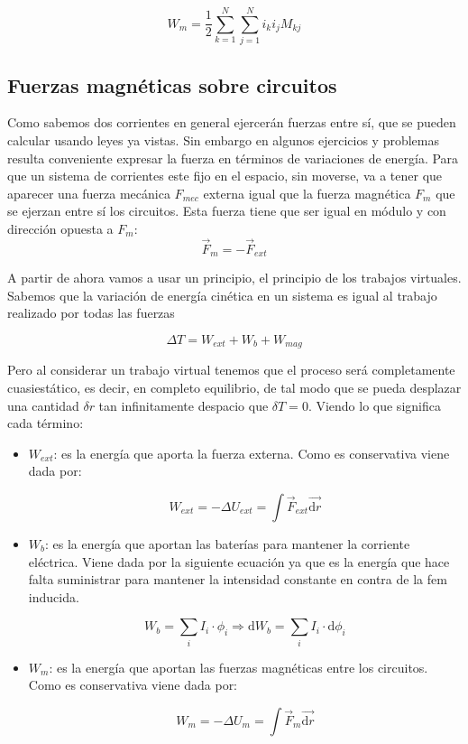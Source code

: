 \documentclass[12pt,a4paper]{article}
\newcommand{\D}{\mathrm{d}}
\begin{document}
\begin{equation}
W_m = \dfrac{1}{2} \sum_{k=1}^N  \sum_{j=1}^N i_k i_j M_{kj}
\end{equation}

\subsection{Fuerzas magnéticas sobre circuitos}

Como sabemos dos corrientes en general ejercerán fuerzas entre sí, que se pueden calcular usando leyes ya vistas. Sin embargo en algunos ejercicios y problemas resulta conveniente expresar la fuerza en términos de variaciones de energía. Para que un sistema de corrientes este fijo en el espacio, sin moverse, va a tener que aparecer una fuerza mecánica $F_{mec}$ externa igual que la fuerza magnética $F_m$ que se ejerzan entre sí los circuitos. Esta fuerza tiene que ser igual en módulo y con dirección opuesta a $F_m$: \\

\begin{equation}
\vec{F}_m = -  \vec{F}_{ext}
\end{equation}

A partir de ahora vamos a usar un principio, el principio de los trabajos virtuales. Sabemos que la variación de energía cinética en un sistema es igual al trabajo realizado por todas las fuerzas 

\begin{equation}
\Delta T = W_{ext} + W_{b} + W_{mag}
\end{equation}

Pero al considerar un trabajo virtual tenemos que el proceso será completamente cuasiestático, es decir, en completo equilibrio, de tal modo que se pueda desplazar una cantidad $\delta r$ tan infinitamente despacio que $\delta T = 0$. Viendo lo que significa cada término:

\begin{itemize}
\item $W_{ext}$: es la energía que aporta la fuerza externa. Como es conservativa viene dada por: 

$$W_{ext} = - \Delta U_{ext} = \int \vec{F}_{ext} \vec{\D r} $$

\item $W_{b}$: es la energía que aportan las baterías para mantener la corriente eléctrica. Viene dada por la siguiente ecuación ya que es la energía que hace falta suministrar para mantener la intensidad constante en contra de la fem inducida.

$$W_{b} = \sum_i I_i  \cdot \phi_i  \Longrightarrow \D W_b = \sum_i I_i \cdot \D \phi_i $$ 

\item $W_{m}$: es la energía que aportan las fuerzas magnéticas entre los circuitos. Como es conservativa viene dada por: 

$$W_{m} = - \Delta U_{m} = \int \vec{F}_{m} \vec{\D r} $$


\end{itemize}
\end{document}
